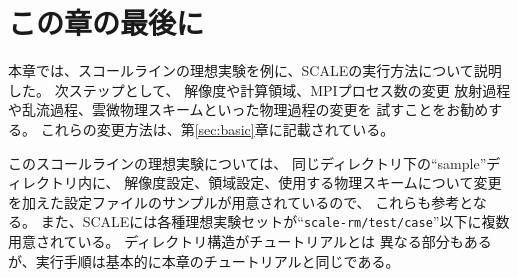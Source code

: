 \section{この章の最後に}

本章では、スコールラインの理想実験を例に、SCALEの実行方法について説明した。
次ステップとして、
解像度や計算領域、MPIプロセス数の変更
放射過程や乱流過程、雲微物理スキームといった物理過程の変更を
試すことをお勧めする。
これらの変更方法は、第\ref{sec:basic}章に記載されている。

このスコールラインの理想実験については、
同じディレクトリ下の``sample''ディレクトリ内に、
解像度設定、領域設定、使用する物理スキームについて変更を加えた設定ファイルのサンプルが用意されているので、
これらも参考となる。
また、SCALEには各種理想実験セットが``\verb|scale-rm/test/case|''以下に複数用意されている。
ディレクトリ構造がチュートリアルとは
異なる部分もあるが、実行手順は基本的に本章のチュートリアルと同じである。
